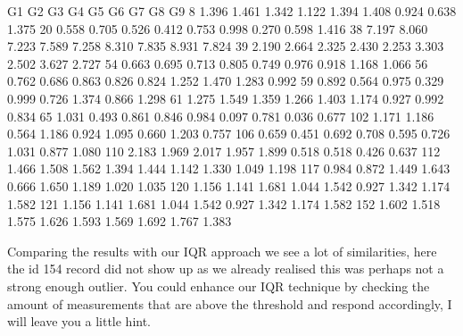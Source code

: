 \documentclass[letterpaper,10pt,english]{jupyterBook}
\begin{document}
\begin{sphinxVerbatim}[commandchars=\\\{\}]
        G1     G2     G3     G4     G5     G6     G7     G8     G9
8    1.396  1.461  1.342  1.122  1.394  1.408  0.924  0.638  1.375
20  \PYGZhy{}0.558 \PYGZhy{}0.705 \PYGZhy{}0.526 \PYGZhy{}0.412 \PYGZhy{}0.753 \PYGZhy{}0.998 \PYGZhy{}0.270  0.598 \PYGZhy{}1.416
38   7.197  8.060  7.223  7.589  7.258  8.310  7.835  8.931  7.824
39   2.190  2.664  2.325  2.430  2.253  3.303  2.502  3.627  2.727
54  \PYGZhy{}0.663 \PYGZhy{}0.695 \PYGZhy{}0.713 \PYGZhy{}0.805 \PYGZhy{}0.749 \PYGZhy{}0.976 \PYGZhy{}0.918 \PYGZhy{}1.168 \PYGZhy{}1.066
56  \PYGZhy{}0.762 \PYGZhy{}0.686 \PYGZhy{}0.863 \PYGZhy{}0.826 \PYGZhy{}0.824 \PYGZhy{}1.252 \PYGZhy{}1.470 \PYGZhy{}1.283 \PYGZhy{}0.992
59  \PYGZhy{}0.892 \PYGZhy{}0.564 \PYGZhy{}0.975 \PYGZhy{}0.329 \PYGZhy{}0.999 \PYGZhy{}0.726 \PYGZhy{}1.374 \PYGZhy{}0.866 \PYGZhy{}1.298
61   1.275  1.549  1.359  1.266  1.403  1.174  0.927  0.992  0.834
65  \PYGZhy{}1.031 \PYGZhy{}0.493 \PYGZhy{}0.861 \PYGZhy{}0.846 \PYGZhy{}0.984 \PYGZhy{}0.097 \PYGZhy{}0.781  0.036 \PYGZhy{}0.677
102 \PYGZhy{}1.171 \PYGZhy{}1.186 \PYGZhy{}0.564 \PYGZhy{}1.186 \PYGZhy{}0.924 \PYGZhy{}1.095 \PYGZhy{}0.660 \PYGZhy{}1.203 \PYGZhy{}0.757
106 \PYGZhy{}0.659 \PYGZhy{}0.451 \PYGZhy{}0.692 \PYGZhy{}0.708 \PYGZhy{}0.595 \PYGZhy{}0.726 \PYGZhy{}1.031 \PYGZhy{}0.877 \PYGZhy{}1.080
110  2.183  1.969  2.017  1.957  1.899  0.518  0.518  0.426  0.637
112  1.466  1.508  1.562  1.394  1.444  1.142  1.330  1.049  1.198
117  0.984  0.872  1.449  1.643  0.666  1.650  1.189  1.020  1.035
120  1.156  1.141  1.681  1.044  1.542  0.927  1.342  1.174  1.582
121  1.156  1.141  1.681  1.044  1.542  0.927  1.342  1.174  1.582
152  1.602  1.518  1.575  1.626  1.593  1.569  1.692  1.767  1.383
\end{sphinxVerbatim}

\sphinxAtStartPar
Comparing the results with our IQR approach we see a lot of similarities, here the id 154 record did not show up as we already realised this was perhaps not a strong enough outlier.
You could enhance our IQR technique by checking the amount of measurements that are above the threshold and respond accordingly, I will leave you a little hint.

\begin{sphinxVerbatim}[commandchars=\\\{\}]
\end{sphinxVerbatim}
\end{document}
